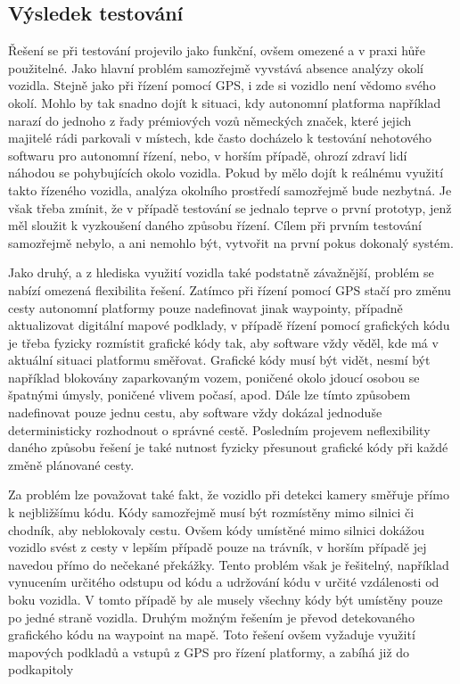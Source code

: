 \documentclass[czech, bachelor]{diploma}
\begin{document}
\subsection{Výsledek testování}

Řešení se při testování projevilo jako funkční, ovšem omezené a v praxi hůře použitelné. Jako hlavní problém samozřejmě vyvstává
absence analýzy okolí vozidla. Stejně jako při řízení pomocí GPS, i zde si vozidlo není vědomo svého okolí. Mohlo by tak snadno
dojít k situaci, kdy autonomní platforma například narazí do jednoho z řady prémiových vozů německých značek, které jejich 
majitelé rádi parkovali v místech, kde často docházelo k testování nehotového softwaru pro autonomní řízení, nebo, v horším 
případě, ohrozí zdraví lidí náhodou se pohybujících okolo vozidla. Pokud by mělo dojít k reálnému využití takto řízeného vozidla,
analýza okolního prostředí samozřejmě bude nezbytná. Je však třeba zmínit, že v případě testování se jednalo teprve o první 
prototyp, jenž měl sloužit k vyzkoušení daného způsobu řízení. Cílem při prvním testování samozřejmě nebylo, a ani nemohlo být,
vytvořit na první pokus dokonalý systém.

Jako druhý, a z hlediska využití vozidla také podstatně závažnější, problém se nabízí omezená flexibilita řešení. Zatímco při 
řízení pomocí GPS stačí pro změnu cesty autonomní platformy pouze nadefinovat jinak waypointy, případně aktualizovat digitální 
mapové podklady, v případě řízení pomocí grafických kódu je třeba fyzicky rozmístit grafické kódy tak, aby software vždy věděl,
kde má v aktuální situaci platformu směřovat. Grafické kódy musí být vidět, nesmí být například blokovány zaparkovaným vozem,
poničené okolo jdoucí osobou se špatnými úmysly, poničené vlivem počasí, apod. Dále lze tímto způsobem nadefinovat pouze jednu
cestu, aby software vždy dokázal jednoduše deterministicky rozhodnout o správné cestě. Posledním projevem neflexibility daného
způsobu řešení je také nutnost fyzicky přesunout grafické kódy při každé změně plánované cesty.

Za problém lze považovat také fakt, že vozidlo při detekci kamery směřuje přímo k nejbližšímu kódu. Kódy samozřejmě musí být 
rozmístěny mimo silnici či chodník, aby neblokovaly cestu. Ovšem kódy umístěné mimo silnici dokážou vozidlo svést z cesty 
v lepším případě pouze na trávník, v horším případě jej navedou přímo do nečekané překážky. Tento problém však je řešitelný,
například vynucením určitého odstupu od kódu a udržování kódu v určité vzdálenosti od boku vozidla.  V tomto případě by ale musely
všechny kódy být umístěny pouze po jedné straně vozidla. Druhým možným řešením je převod detekovaného grafického kódu na waypoint
na mapě. Toto řešení ovšem vyžaduje využití mapových podkladů a vstupů z GPS pro řízení platformy, a zabíhá již do podkapitoly 
\end{document}
